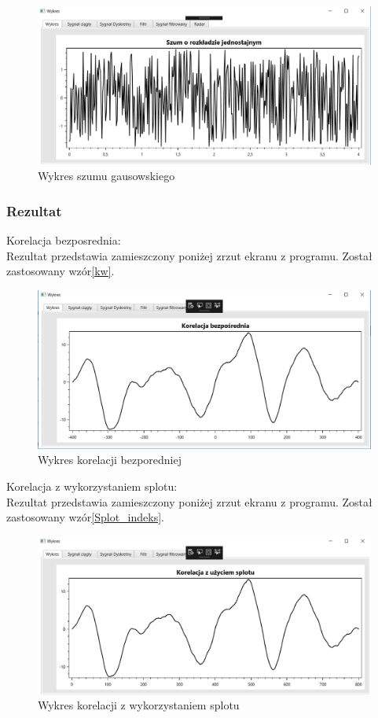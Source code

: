 \documentclass[12pt]{article}
\begin{document}
\begin{figure}[h!]
 \centering
 \includegraphics[width=12.3cm]{szum.PNG}
 \vspace{-0.3cm}
 \caption{Wykres szumu gausowskiego}
 \label{szum}
\end{figure}
 \newpage
\subsubsection{Rezultat}
\newpage
Korelacja bezposrednia:
\\Rezultat przedstawia zamieszczony poniżej zrzut ekranu z programu.  Został zastosowany wzór\ref{kw}.
\begin{figure}[h!]
 \centering
 \includegraphics[width=12.3cm]{korB.PNG}
 \vspace{-0.3cm}
 \caption{Wykres korelacji bezporedniej}
 \label{wk}
\end{figure}

Korelacja z wykorzystaniem splotu:
\\Rezultat przedstawia zamieszczony poniżej zrzut ekranu z programu.  Został zastosowany wzór\ref{Splot_indeks}.
\begin{figure}[h!]
 \centering
 \includegraphics[width=12.3cm]{korS.PNG}
 \vspace{-0.3cm}
 \caption{Wykres korelacji z wykorzystaniem splotu}
 \label{redtrfytguyhiuj}
\end{figure}
\end{document}

